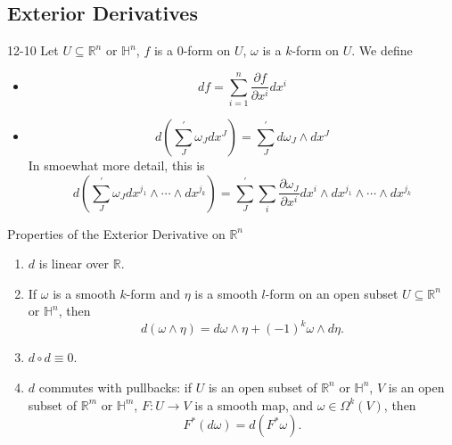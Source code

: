 \documentclass[../main.tex]{subfiles}
\begin{document}
\subsection{Exterior Derivatives}

\begin{definition}{}{12-10}
    Let \(  U\subseteq \mathbb{R} ^{n}  \) or \(  \mathbb{H}^{n}  \), \(  f  \) is a 0-form on \(  U  \), \(   \omega   \) is a \(  k  \)-form on \(  U  \).       We define
    \begin{itemize}
        \item \[
        df= \sum _{i= 1}^{n}\frac{\partial f}{\partial x^{i}} dx^{i}
        \]
        \item \[
        d\left( \sum _{J}^{\prime}  \omega _{J}d x^{J} \right)= \sum _{J}^{\prime} d  \omega _{J} \wedge dx^{J} 
        \]In smoewhat more detail, this is \[
        d\left( \sum _{J}^{\prime}  \omega _{J}d x^{j_1}\wedge \cdots \wedge dx^{j_{k}} \right)= \sum _{J}^{\prime} \sum _{i}\frac{\partial  \omega _{J}}{\partial x^{i}}d x^{i}\wedge dx^{j_1}\wedge \cdots \wedge dx^{j_{k}} 
        \]
    \end{itemize}
     
\end{definition}

\begin{proposition}{Properties of the Exterior Derivative on \(  \mathbb{R}^n  \) }{}
\begin{enumerate}
\item $d$ is linear over $\mathbb{R}$.
\item If $\omega$ is a smooth $k$-form and $\eta$ is a smooth $l$-form on an open subset $U \subseteq \mathbb{R}^n$ or $\mathbb{H}^n$, then
\[
d(\omega \wedge \eta) = d\omega \wedge \eta + (-1)^k \omega \wedge d\eta.
\]
\item $d \circ d \equiv 0$.
\item $d$ commutes with pullbacks: if $U$ is an open subset of $\mathbb{R}^n$ or $\mathbb{H}^n$, $V$ is an open subset of $\mathbb{R}^m$ or $\mathbb{H}^m$, $F \colon U \to V$ is a smooth map, and $\omega \in \Omega^k(V)$, then
\begin{equation}
F^*(d\omega) = d\left(F^*\omega\right). 
\end{equation}
\end{enumerate}
\end{proposition}
\end{document}
